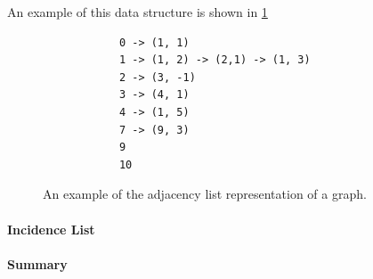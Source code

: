         An example of this data structure is shown in \ref{edgelist}
        
        \begin{figure}[htp]\label{edgelist}
         \begin{center}
          \begin{verbatim}
            0 -> (1, 1)
            1 -> (1, 2) -> (2,1) -> (1, 3)
            2 -> (3, -1)
            3 -> (4, 1)
            4 -> (1, 5)
            7 -> (9, 3)
            9
            10
          \end{verbatim}
         \end{center}
         \caption{An example of the adjacency list representation of a graph.}
        \end{figure}
        
        \paragraph{Incidence List}
        
        \paragraph{Summary}
        
